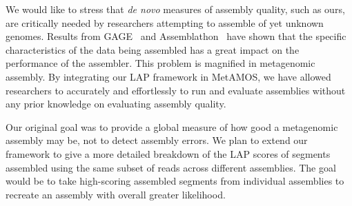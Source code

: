 \documentclass[conference]{IEEEtran}
\begin{document}

We would like to stress that \emph{de novo} measures of assembly quality, such as ours, are critically needed by researchers attempting to assemble of yet unknown genomes.
Results from GAGE~\cite{salzberg2011gage} and Assemblathon~\cite{earl2011assemblathon,bradnam2013assemblathon} have shown that the specific characteristics of the data being assembled has a great impact on the performance of the assembler.
This problem is magnified in metagenomic assembly.
By integrating our LAP framework in MetAMOS, we have allowed researchers to accurately and effortlessly to run and evaluate assemblies without any prior knowledge on evaluating assembly quality.

Our original goal was to provide a global measure of how good a metagenomic assembly may be, not to detect assembly errors.
We plan to extend our framework to give a more detailed breakdown of the LAP scores of segments assembled using the same subset of reads across different assemblies.
The goal would be to take high-scoring assembled segments from individual assemblies to recreate an assembly with overall greater likelihood.

%
%

\end{document}
